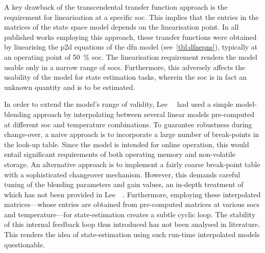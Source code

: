 A  key  drawback  of  the  transcendental  transfer  function  approach  is  the
requirement for  linearisation at  a specific \gls{soc}.  This implies  that the
entries in  the matrices of the  state space model depends  on the linearisation
point. In all published works  employing this approach, these transfer functions
were  obtained by  linearising the  \gls{p2d} equations  of the  \gls{dfn} model
(see~\cref{tbl:dfneqns}), typically  at an operating point  of \SI{50}{\percent}
\gls{soc}.  The linearisation  requirement renders  the model  usable only  in a
narrow range of  \glspl{soc}. Furthermore, this adversely  affects the usability
of the  model for state  estimation tasks, wherein the  \gls{soc} is in  fact an
unknown quantity and is to be estimated.


In order to extend the model's range of validity, Lee~\etal{}~\cite{Lee2014} had
used a  simple model-blending approach  by interpolating between  several linear
models  pre-computed at  different  \gls{soc} and  temperature combinations.  To
guarantee robustness  during change-over, a  naive approach is to  incorporate a
large  number  of  break-points  in  the  look-up  table.  Since  the  model  is
intended  for  online  operation,  this would  entail  significant  requirements
of  both operating  memory  and non-volatile  storage.  An alternative  approach
is  to  implement  a  fairly  coarse  break-point  table  with  a  sophisticated
changeover  mechanism. However,  this  demands careful  tuning  of the  blending
parameters  and  gain values,  an  in-depth  treatment  of  which has  not  been
provided in Lee~\etal~\cite{Lee2014}.  Furthermore, employing these interpolated
matrices---whose  entries are  obtained  from pre-computed  matrices at  various
\glspl{soc} and temperature---for state-estimation creates a subtle cyclic loop.
The  stability of  this  internal feedback  loop thus  introduced  has not  been
analysed in  literature. This  renders the idea  of state-estimation  using such
run-time interpolated models questionable.



